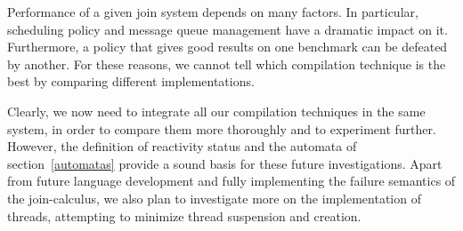 Performance of a given join system depends on many factors. In
particular, scheduling policy and message queue management have a
dramatic impact on it. Furthermore, a policy that gives good results
on one benchmark can be defeated by another.  For these reasons, we
cannot tell which compilation technique is the best by comparing
different implementations.



Clearly, we now need to integrate all our compilation techniques in
the same system, in order to compare them more thoroughly and to
experiment further.  However, the definition of reactivity status and
the automata of section~\ref{automatas} provide a sound
basis for these future investigations.  Apart from future language
development and fully implementing the failure semantics of the
join-calculus, we also plan to investigate more on the implementation
of threads, attempting to minimize thread suspension and creation.









%
%
%
